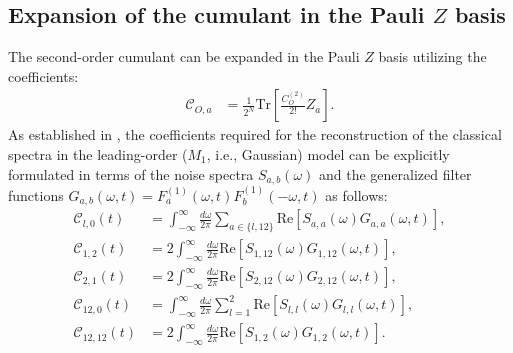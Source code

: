 \documentclass[%
 reprint,
superscriptaddress,
 amsmath,amssymb,
 aps,
pra,
]{revtex4-2}
\newcommand{\qk}[1]{{\color{OliveGreen}#1}}
\begin{document}
\begin{widetext}
\section{Expansion of the cumulant in the Pauli $Z$ basis}
\label{app::COs}
The second-order cumulant can be expanded in the Pauli $Z$ basis utilizing the coefficients:
\begin{align}
    \mathcal{C}_{O,a}&=\frac{1}{2^N}\text{Tr}\left[\frac{C_O^{(2)}}{2!}Z_a\right].
\end{align}
As established in \cite{PhysRevA.95.022121}, the coefficients required for the reconstruction of the classical spectra in the \qk{leading-order ($M_1$, i.e., Gaussian)} model can be explicitly formulated in terms of the noise spectra $S_{a,b}(\omega)$ and the generalized filter functions $G_{a,b}(\omega, t) = F_a^{(1)}(\omega, t)F_b^{(1)}(-\omega, t)$ as follows:
\begin{align}
    \mathcal{C}_{l,0}(t)&=\int_{-\infty}^\infty \frac{d\omega}{2\pi}\sum_{a\in \{l,12\}}\text{Re}\left[S_{a,a}(\omega)G_{a,a}(\omega, t)\right],\\
    \label{eq::c1,2}
    \mathcal{C}_{1,2}(t)&=2\int_{-\infty}^\infty \frac{d\omega}{2\pi}\text{Re}\left[S_{1,12}(\omega)G_{1,12}(\omega, t)\right],\\
    \label{eq::c2,1}
    \mathcal{C}_{2,1}(t)&=2\int_{-\infty}^\infty \frac{d\omega}{2\pi}\text{Re}\left[S_{2,12}(\omega)G_{2,12}(\omega, t)\right],\\
    \mathcal{C}_{12,0}(t)&=\int_{-\infty}^\infty \frac{d\omega}{2\pi}\sum_{l=1}^2\text{Re}\left[S_{l,l}(\omega)G_{l,l}(\omega, t)\right],\\
    \label{eq::c1212}
    \mathcal{C}_{12,12}(t)&=2\int_{-\infty}^\infty \frac{d\omega}{2\pi}\text{Re}\left[S_{1,2}(\omega)G_{1,2}(\omega,t)\right].
\end{align}
\end{widetext}
\end{document}
